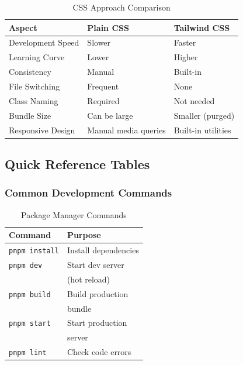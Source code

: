 \begin{table}[H]
\centering
\begin{tabular}{|l|l|l|}
\hline

\textbf{Aspect} & \textbf{Plain CSS} & \textbf{Tailwind CSS} \\
\hline
Development Speed & Slower & Faster \\
\hline
Learning Curve & Lower & Higher \\
\hline
Consistency & Manual & Built-in \\
\hline
File Switching & Frequent & None \\
\hline
Class Naming & Required & Not needed \\
\hline
Bundle Size & Can be large & Smaller (purged) \\
\hline
Responsive Design & Manual media queries & Built-in utilities \\
\hline
\end{tabular}
\caption{CSS Approach Comparison}
\end{table}

\subsection{Quick Reference Tables}

\subsubsection{Common Development Commands}

\begin{table}[H]
\centering
\begin{tabular}{|l|l|}
\hline

\textbf{Command} & \textbf{Purpose} \\
\hline
\texttt{pnpm install} & Install dependencies \\
\hline
\texttt{pnpm dev} & Start dev server \\
 & (hot reload) \\
\hline
\texttt{pnpm build} & Build production \\
 & bundle \\
\hline
\texttt{pnpm start} & Start production \\
 & server \\
\hline
\texttt{pnpm lint} & Check code errors \\
\hline
\end{tabular}
\caption{Package Manager Commands}
\end{table}

